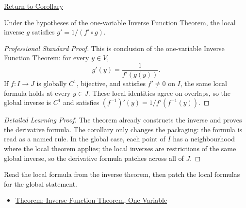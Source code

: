\newpage
{}
\label{prf:inverse-function-derivative}

\begin{remark*}[Return]
\hyperref[cor:inverse-function-derivative]{Return to Corollary}
\end{remark*}

\begin{corollary*}
Under the hypotheses of the one-variable Inverse Function Theorem, the local inverse \(g\) satisfies \(g'=1/(f'\circ g)\).
\end{corollary*}

\begin{proof}[Professional Standard Proof]
\LRAProofBodyStart
This is conclusion of the one-variable Inverse Function Theorem: for every \(y\in V\),
\[
  g'(y)=\frac{1}{f'(g(y))}.
\]
If \(f:I\to J\) is globally \(C^1\), bijective, and satisfies \(f'\neq 0\) on \(I\), the same local formula holds at every \(y\in J\). These local identities agree on overlaps, so the global inverse is \(C^1\) and satisfies \((f^{-1})'(y)=1/f'(f^{-1}(y))\).
\end{proof}

\begin{proof}[Detailed Learning Proof]
\LRAProofBodyStart
The theorem already constructs the inverse and proves the derivative formula. The corollary only changes the packaging: the formula is read as a named rule. In the global case, each point of \(I\) has a neighbourhood where the local theorem applies; the local inverses are restrictions of the same global inverse, so the derivative formula patches across all of \(J\).
\end{proof}

\begin{remark*}
Read the local formula from the inverse theorem, then patch the local formulas for the global statement.
\end{remark*}

\begin{dependencies}
\begin{itemize}
  \item \hyperref[thm:inverse-function-theorem-one-variable]{Theorem: Inverse Function Theorem, One Variable}
\end{itemize}
\end{dependencies}

\clearpage
